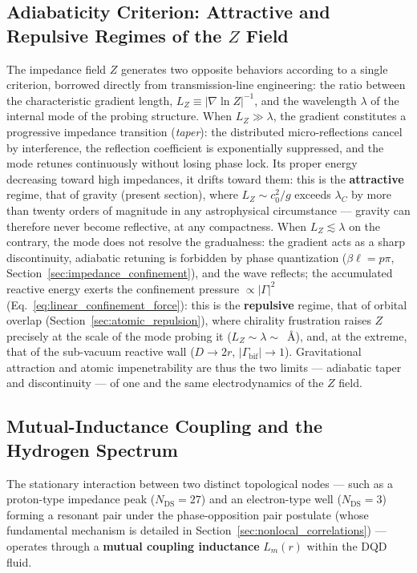 \documentclass[11pt,a4paper]{article}
\theoremstyle{plain}
\theoremstyle{remark}
\newcommand{\Ncd}{\ensuremath{N_{\mathrm{DS}}}}
\begin{document}
\subsection{Adiabaticity Criterion: Attractive and Repulsive Regimes of the $Z$ Field}
\label{sec:adiabaticity}
The impedance field $Z$ generates two opposite behaviors according to a single criterion, borrowed directly from transmission-line engineering: the ratio between the characteristic gradient length, $L_Z \equiv |\nabla \ln Z|^{-1}$, and the wavelength $\lambda$ of the internal mode of the probing structure. When $L_Z \gg \lambda$, the gradient constitutes a progressive impedance transition (\emph{taper}): the distributed micro-reflections cancel by interference, the reflection coefficient is exponentially suppressed, and the mode retunes continuously without losing phase lock. Its proper energy decreasing toward high impedances, it drifts toward them: this is the \textbf{attractive} regime, that of gravity (present section), where $L_Z \sim c_0^2/g$ exceeds $\lambda_C$ by more than twenty orders of magnitude in any astrophysical circumstance --- gravity can therefore never become reflective, at any compactness. When $L_Z \lesssim \lambda$ on the contrary, the mode does not resolve the gradualness: the gradient acts as a sharp discontinuity, adiabatic retuning is forbidden by phase quantization ($\beta\ell = p\pi$, Section~\ref{sec:impedance_confinement}), and the wave reflects; the accumulated reactive energy exerts the confinement pressure $\propto|\Gamma|^2$ (Eq.~\eqref{eq:linear_confinement_force}): this is the \textbf{repulsive} regime, that of orbital overlap (Section~\ref{sec:atomic_repulsion}), where chirality frustration raises $Z$ precisely at the scale of the mode probing it ($L_Z \sim \lambda \sim$~\AA), and, at the extreme, that of the sub-vacuum reactive wall ($D \to 2r$, $|\Gamma_{\text{bif}}| \to 1$). Gravitational attraction and atomic impenetrability are thus the two limits --- adiabatic taper and discontinuity --- of one and the same electrodynamics of the $Z$ field.

\subsection{Mutual-Inductance Coupling and the Hydrogen Spectrum}
The stationary interaction between two distinct topological nodes --- such as a proton-type impedance peak ($\Ncd=27$) and an electron-type well ($\Ncd=3$) forming a resonant pair under the phase-opposition pair postulate (whose fundamental mechanism is detailed in Section~\ref{sec:nonlocal_correlations}) --- operates through a \textbf{mutual coupling inductance} $L_m(r)$ within the DQD fluid.
\end{document}
